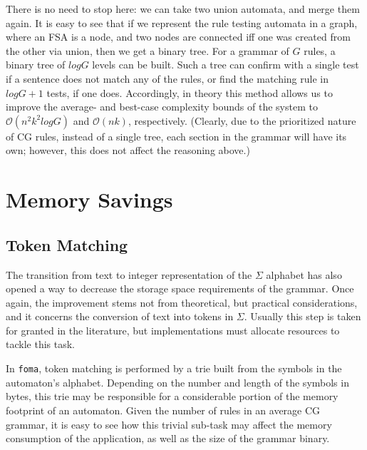 \documentclass{article}
\begin{document}
There is no need to stop here: we can take two union automata, and merge them
again. It is easy to see that if we represent the rule testing automata in a
graph, where an FSA is a node, and two nodes are connected iff one was created
from the other via union, then we get a binary tree. For a grammar of $G$ rules,
a binary tree of $logG$ levels can be built. Such a tree can confirm with a
single test if a sentence does not match any of the rules, or find the matching
rule in $logG + 1$ tests, if one does. Accordingly, in theory this method
allows us to improve the average- and best-case complexity bounds of the system
to $\mathcal{O}(n^2k^2logG)$ and $\mathcal{O}(nk)$, respectively.  %
(Clearly, due to the prioritized nature of CG rules, instead of a single tree,
each section in the grammar will have its own; however, this does not affect
the reasoning above.)  %


\section{Memory Savings}
\label{sec:memory}


\subsection{Token Matching}
\label{sec:sub_token}

The transition from text to integer representation of the $\Sigma$ alphabet
has also opened a way to decrease the storage space requirements of the grammar.
Once again, the improvement stems not from theoretical, but practical
considerations, and it concerns the conversion of text into tokens in $\Sigma$.
Usually this step is taken for granted in the literature, but implementations
must allocate resources to tackle this task.  %

In \texttt{foma}, token matching is performed by a trie built from the symbols
in the automaton's alphabet. Depending on the number and length of the symbols
in bytes, this trie may be responsible for a considerable portion of the memory
footprint of an automaton. Given the number of rules in an average CG grammar,
it is easy to see how this trivial sub-task may affect the memory consumption of
the application, as well as the size of the grammar binary.
\end{document}
